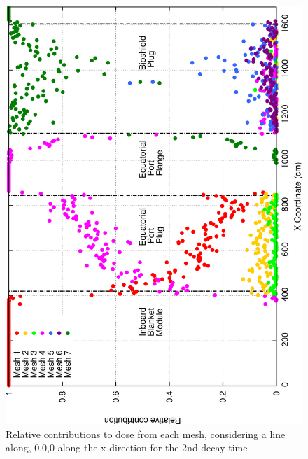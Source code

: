 \documentclass[12pt]{article}
\begin{document}
\begin{figure}[ht!]
\centering
\includegraphics[clip,scale=0.25]{../plots/crosstalk/b4c/ep/dc2_rel.png}
\caption{Relative contributions to dose from each mesh, considering a line along, 0,0,0 along the x direction for the 2nd decay time}
\label{fig:b4c_ct_ep_dc2_rel}
\end{figure}
\end{document}
